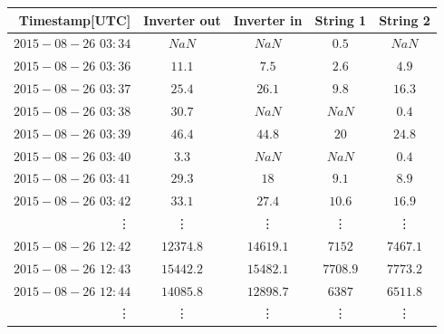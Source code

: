 \begin{table}[h]

\centering

\begin{tabular}{r|cccc} \hline\hline

Timestamp[UTC] & Inverter out & Inverter in & String 1 & String 2\\ \hline
$2015-08-26$ $03:34$ & $NaN$ & $NaN$ & $0.5$ & $NaN$\\
$2015-08-26$ $03:36$ & $11.1$ & $7.5$ & $2.6$ & $4.9$\\
$2015-08-26$ $03:37$ & $25.4$ & $26.1$ & $9.8$ & $16.3$\\
$2015-08-26$ $03:38$ & $30.7$& $NaN$ & $NaN$ & $0.4$\\
$2015-08-26$ $03:39$ & $46.4$& $44.8$ & $20$ & $24.8$\\
$2015-08-26$ $03:40$ & $3.3$ & $NaN$ & $NaN$ & $0.4$\\
$2015-08-26$ $03:41$ & $29.3$ &  $18$ & $9.1$ & $8.9$\\
$2015-08-26$ $03:42$ & $33.1$& $27.4$ & $10.6$ & $16.9$\\

\vdots & \vdots & \vdots & \vdots & \vdots\\
$2015-08-26$ $12:42$ & $12374.8$ & $14619.1$ & $7152$ & $7467.1$\\
$2015-08-26$ $12:43$ & $15442.2$ & $15482.1 $& $7708.9$ & $7773.2$\\
$2015-08-26$ $12:44$ & $14085.8$ & $12898.7$ & $6387$ & $6511.8$ \\
\vdots & \vdots & \vdots & \vdots & \vdots\\

\hline\hline
\end{tabular}

\label{table_fmi_kumpula_csv}
\end{table}





